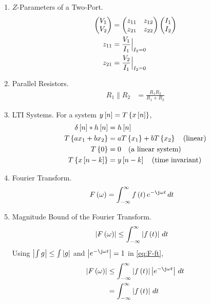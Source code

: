 \begin{enumerate}[label=\thesubsection.\arabic*, ref=\thesubsection.\theenumi]
\begin{align}
\\
\omega L &= \frac{1}{\omega C}
\\
C &= \frac{1}{\omega^2 L}
\label{eq:F-resonance}
\end{align}
\item $Z$-Parameters of a Two-Port.
\begin{align}
\begin{pmatrix}V_1 \\ V_2\end{pmatrix} &= \begin{pmatrix}z_{11} & z_{12} \\ z_{21} & z_{22}\end{pmatrix} \begin{pmatrix}I_1 \\ I_2\end{pmatrix}
\label{eq:F-zdef}
\\
z_{11} &= \frac{V_1}{I_1}\Big|_{I_2 = 0}
\\
z_{21} &= \frac{V_2}{I_1}\Big|_{I_2 = 0}
\label{eq:F-zparam}
\end{align}
\item Parallel Resistors.
\begin{align}
R_1 \parallel R_2 &= \frac{R_1 R_2}{R_1 + R_2}
\label{eq:F-rnet}
\end{align}
\item LTI Systems. For a system $y{}\left[n\right] = T\left\{x{}\left[n\right]\right\}$,
\begin{align}
\delta{}\left[n\right] * h{}\left[n\right] &= h{}\left[n\right]
\label{eq:F-conv}
\\
T\left\{a x_1 + b x_2\right\} &= a T\left\{x_1\right\} + b T\left\{x_2\right\} \quad \text{(linear)}
\label{eq:F-linear}
\\
T\left\{0\right\} &= 0 \quad \text{(a linear system)}
\label{eq:F-zero}
\\
T\left\{x{}\left[n - k\right]\right\} &= y{}\left[n - k\right] \quad \text{(time invariant)}
\label{eq:F-ti}
\end{align}
\item Fourier Transform.
\begin{align}
F\brak{\omega} &= \int_{-\infty}^{\infty} f\brak{t} e^{-\j \omega t} \,dt
\label{eq:F-ft}
\end{align}
\item Magnitude Bound of the Fourier Transform.
\begin{align}
\left\vert F\left(\omega\right)\right\vert &\le \int_{-\infty}^{\infty} \left\vert f\left(t\right)\right\vert \,dt
\label{eq:F-ft-bound}
\end{align}
\solution Using $\left\vert\int g\right\vert \le \int \left\vert g\right\vert$ and $\abs{e^{-\j \omega t}} = 1$ in \eqref{eq:F-ft},
\begin{align}
\abs{F\brak{\omega}} &\le \int_{-\infty}^{\infty} \abs{f\brak{t}} \abs{e^{-\j \omega t}} \,dt
\\
&= \int_{-\infty}^{\infty} \abs{f\brak{t}} \,dt
\end{align}

\end{enumerate}
